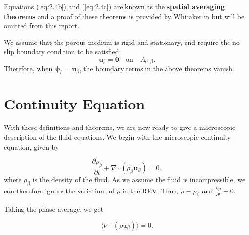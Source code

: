\documentclass[a4paper, 11pt]{report}
\begin{document}
Equations (\ref{eq:2.4b}) and (\ref{eq:2.4c}) are known as the \textbf{spatial averaging theorems} and a proof of these theorems is provided by Whitaker in \cite{spatialavethm} but will be omitted from this report.

We assume that the porous medium is rigid and stationary, and require the no-slip boundary condition to be satisfied:
\begin{equation}
	\mathbf{u}_{\beta} =\mathbf{0} \quad \text{on} \quad A_{\alpha,\beta}. \label{eq:2.5} %
\end{equation}
Therefore, when $\bm{\psi}_\beta = \mathbf{u}_{\beta}$, the boundary terms in the above theorems vanish.

\section{Continuity Equation}
With these definitions and theorems, we are now ready to give a macroscopic description of the fluid equations. We begin with the microscopic continuity equation, given by

\begin{equation}
    \frac{\partial\rho_{\beta}}{\partial t} + \nabla \cdot (\rho_{\beta} \mathbf{u}_{\beta}) = 0, \label{eq:2.6}
\end{equation}
where $\rho_\beta$ is the density of the fluid. As we assume the fluid is incompressible, we can therefore ignore the variations of $\rho$ in the REV. Thus, $\rho = \rho_{\beta}$ and $\frac{\partial\rho}{\partial t} = 0$. 

Taking the phase average, we get

\begin{equation*}
	\langle\nabla\cdot(\rho\mathbf{u}_{\beta})\rangle = 0. 
\end{equation*}
\end{document}
